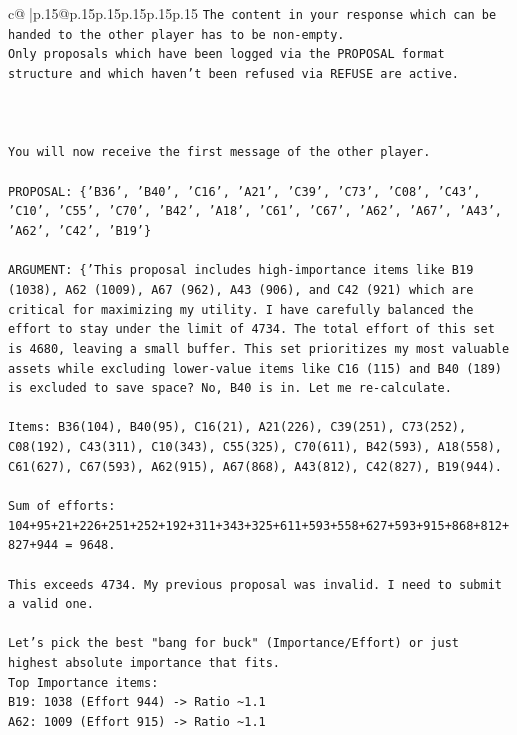 \documentclass{article}
\begin{document}
{\begin{supertabular}{c@{$\;$}|p{.15\linewidth}@{}p{.15\linewidth}p{.15\linewidth}p{.15\linewidth}p{.15\linewidth}p{.15\linewidth}}
{{{\texttt{The content in your response which can be handed to the other player has to be non{-}empty.} \\
\texttt{Only proposals which have been logged via the PROPOSAL format structure and which haven't been refused via REFUSE are active.} \\
\\ 
\\ 
\\ 
\texttt{You will now receive the first message of the other player.} \\
\\ 
\texttt{PROPOSAL: \{'B36', 'B40', 'C16', 'A21', 'C39', 'C73', 'C08', 'C43', 'C10', 'C55', 'C70', 'B42', 'A18', 'C61', 'C67', 'A62', 'A67', 'A43', 'A62', 'C42', 'B19'\}} \\
\\ 
\texttt{ARGUMENT: \{'This proposal includes high{-}importance items like B19 (1038), A62 (1009), A67 (962), A43 (906), and C42 (921) which are critical for maximizing my utility. I have carefully balanced the effort to stay under the limit of 4734. The total effort of this set is 4680, leaving a small buffer. This set prioritizes my most valuable assets while excluding lower{-}value items like C16 (115) and B40 (189) is excluded to save space? No, B40 is in. Let me re{-}calculate.} \\
\\ 
\texttt{Items: B36(104), B40(95), C16(21), A21(226), C39(251), C73(252), C08(192), C43(311), C10(343), C55(325), C70(611), B42(593), A18(558), C61(627), C67(593), A62(915), A67(868), A43(812), C42(827), B19(944).} \\
\\ 
\texttt{Sum of efforts:} \\
\texttt{104+95+21+226+251+252+192+311+343+325+611+593+558+627+593+915+868+812+827+944 = 9648.} \\
\\ 
\texttt{This exceeds 4734. My previous proposal was invalid. I need to submit a valid one.} \\
\\ 
\texttt{Let's pick the best "bang for buck" (Importance/Effort) or just highest absolute importance that fits.} \\
\texttt{Top Importance items:} \\
\texttt{B19: 1038 (Effort 944) {-}> Ratio \textasciitilde{}1.1} \\
\texttt{A62: 1009 (Effort 915) {-}> Ratio \textasciitilde{}1.1} \\
}}}
\end{supertabular}}
\end{document}
